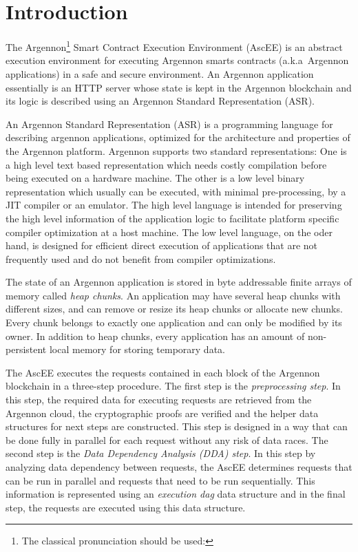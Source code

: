 

\section{Introduction}\label{sec:introduction}

The Argennon\footnote{The classical pronunciation should be used:} Smart Contract Execution
Environment (AscEE) is an abstract execution environment for executing Argennon smarts contracts (a.k.a\ Argennon
applications) in a safe and secure environment. An Argennon application essentially is an HTTP server whose state is
kept in the Argennon blockchain and its logic is described using an Argennon Standard Representation (ASR).

An Argennon Standard Representation (ASR) is a programming language for describing argennon applications, optimized
for the architecture and properties of the Argennon platform.
Argennon supports two standard representations: One is a high level text based representation which needs
costly compilation before being executed on a hardware machine. The other is a low level binary representation which
usually can be executed, with minimal pre-processing, by a JIT compiler or an emulator. The high level
language is intended for preserving the high level information of the application logic to facilitate
platform specific compiler optimization at a host machine. The low level language, on the oder hand, is designed for
efficient direct execution of applications that are not frequently used and do not benefit from compiler optimizations.

The state of an Argennon application is stored in byte addressable finite arrays of memory called
\emph{heap chunks}. An application may have several heap chunks with different sizes, and can remove or
resize its heap chunks or allocate new chunks. Every chunk belongs to exactly one application and can only be modified
by its owner. In addition to heap chunks, every application has an amount of non-persistent local memory for
storing temporary data.

The AscEE executes the requests contained in each block of the Argennon
blockchain in a three-step procedure. The first step is the \emph{preprocessing step}. In this step, the required
data for executing requests are retrieved from the Argennon cloud, the cryptographic proofs are verified and the
helper data structures for next steps are constructed. This step is
designed in a way that can be done fully in parallel for each request without any risk of data races. The second
step is the \emph{Data Dependency Analysis (DDA) step}.
In this step by analyzing data dependency between requests, the AscEE determines requests that can be run in parallel
and requests that need to be run sequentially. This information is represented using an \emph{execution dag} data
structure and in the final step, the requests are executed using this data structure.


